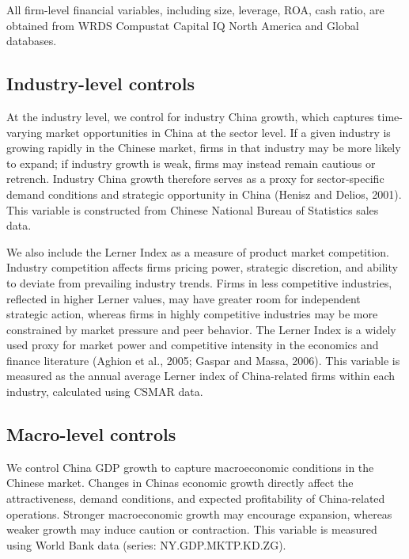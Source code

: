 \documentclass{article}
\begin{document}
All firm-level financial variables, including size, leverage, ROA, cash
ratio, are obtained from WRDS Compustat Capital IQ North America and
Global databases.

\subsection{ Industry-level controls} \label{industry-level-controls}

At the industry level, we control for industry China growth, which
captures time-varying market opportunities in China at the sector level.
If a given industry is growing rapidly in the Chinese market, firms in
that industry may be more likely to expand; if industry growth is weak,
firms may instead remain cautious or retrench. Industry China growth
therefore serves as a proxy for sector-specific demand conditions and
strategic opportunity in China (Henisz and Delios, 2001). This variable
is constructed from Chinese National Bureau of Statistics sales data.

We also include the Lerner Index as a measure of product market
competition. Industry competition affects firms\textquotesingle{}
pricing power, strategic discretion, and ability to deviate from
prevailing industry trends. Firms in less competitive industries,
reflected in higher Lerner values, may have greater room for independent
strategic action, whereas firms in highly competitive industries may be
more constrained by market pressure and peer behavior. The Lerner Index
is a widely used proxy for market power and competitive intensity in the
economics and finance literature (Aghion et al., 2005; Gaspar and Massa,
2006). This variable is measured as the annual average Lerner index of
China-related firms within each industry, calculated using CSMAR data.

\subsection{Macro-level controls}\label{macro-level-controls}

We control China GDP growth to capture macroeconomic conditions in the
Chinese market. Changes in China\textquotesingle s economic growth
directly affect the attractiveness, demand conditions, and expected
profitability of China-related operations. Stronger macroeconomic growth
may encourage expansion, whereas weaker growth may induce caution or
contraction. This variable is measured using World Bank data (series:
NY.GDP.MKTP.KD.ZG).
\end{document}
